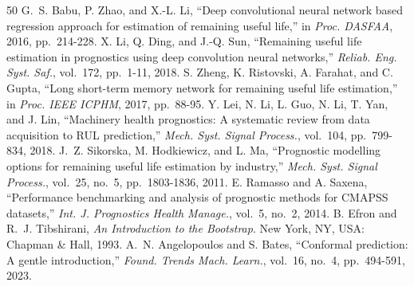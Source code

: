 \documentclass[journal,10pt,twocolumn]{IEEEtran}
\begin{document}
\begin{thebibliography}{50}
G.~S. Babu, P. Zhao, and X.-L. Li, ``Deep convolutional neural network based regression approach for estimation of remaining useful life,'' in \emph{Proc. DASFAA}, 2016, pp.\ 214-228.
X. Li, Q. Ding, and J.-Q. Sun, ``Remaining useful life estimation in prognostics using deep convolution neural networks,'' \emph{Reliab. Eng. Syst. Saf.}, vol.\ 172, pp.\ 1-11, 2018.
S. Zheng, K. Ristovski, A. Farahat, and C. Gupta, ``Long short-term memory network for remaining useful life estimation,'' in \emph{Proc. IEEE ICPHM}, 2017, pp.\ 88-95.
Y. Lei, N. Li, L. Guo, N. Li, T. Yan, and J. Lin, ``Machinery health prognostics: A systematic review from data acquisition to RUL prediction,'' \emph{Mech. Syst. Signal Process.}, vol.\ 104, pp.\ 799-834, 2018.
J.~Z. Sikorska, M. Hodkiewicz, and L. Ma, ``Prognostic modelling options for remaining useful life estimation by industry,'' \emph{Mech. Syst. Signal Process.}, vol.\ 25, no.\ 5, pp.\ 1803-1836, 2011.
E. Ramasso and A. Saxena, ``Performance benchmarking and analysis of prognostic methods for CMAPSS datasets,'' \emph{Int. J. Prognostics Health Manage.}, vol.\ 5, no.\ 2, 2014.
B. Efron and R.~J. Tibshirani, \emph{An Introduction to the Bootstrap}. New York, NY, USA: Chapman \& Hall, 1993.
A.~N. Angelopoulos and S. Bates, ``Conformal prediction: A gentle introduction,'' \emph{Found. Trends Mach. Learn.}, vol.\ 16, no.\ 4, pp.\ 494-591, 2023.
\end{thebibliography}
\end{document}
